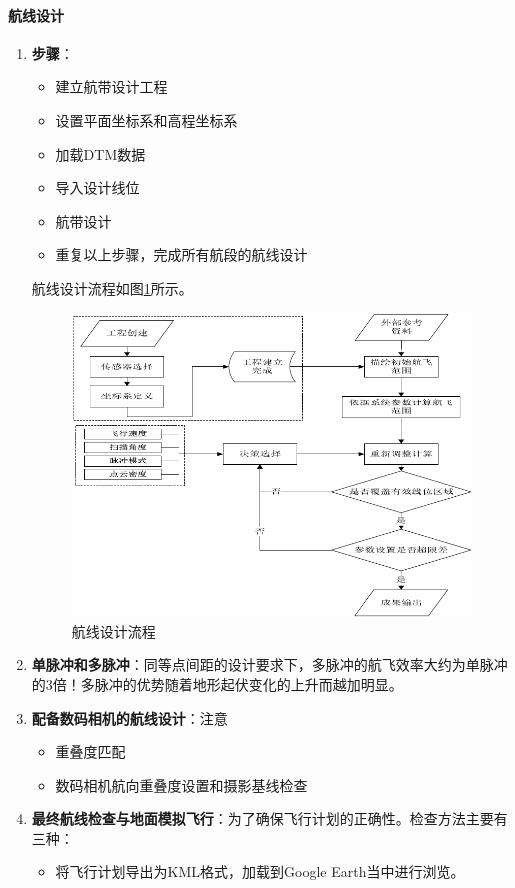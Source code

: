 \paragraph{航线设计}
\begin{enumerate}
	\item \textbf{步骤}：
		\begin{itemize}
			\item 建立航带设计工程
			\item 设置平面坐标系和高程坐标系
			\item 加载DTM数据
			\item 导入设计线位
			\item 航带设计
			\item 重复以上步骤，完成所有航段的航线设计
		\end{itemize}
		航线设计流程如图\ref{fig:航线设计流程}所示。
		\begin{figure}[htbp]
			\centering
			\includegraphics[width=0.7\linewidth]{figure/Chapter5/航线设计流程}
			\caption{航线设计流程}
			\label{fig:航线设计流程}
		\end{figure}
	\item \textbf{单脉冲和多脉冲}：同等点间距的设计要求下，多脉冲的航飞效率大约为单脉冲的3倍！多脉冲的优势随着地形起伏变化的上升而越加明显。
	\item \textbf{配备数码相机的航线设计}：注意
		\begin{itemize}
			\item 重叠度匹配
			\item 数码相机航向重叠度设置和摄影基线检查
		\end{itemize}
	\item \textbf{最终航线检查与地面模拟飞行}：为了确保飞行计划的正确性。检查方法主要有三种：
		\begin{itemize}
			\item 将飞行计划导出为KML格式，加载到Google Earth当中进行浏览。

\end{itemize}
\end{enumerate}
